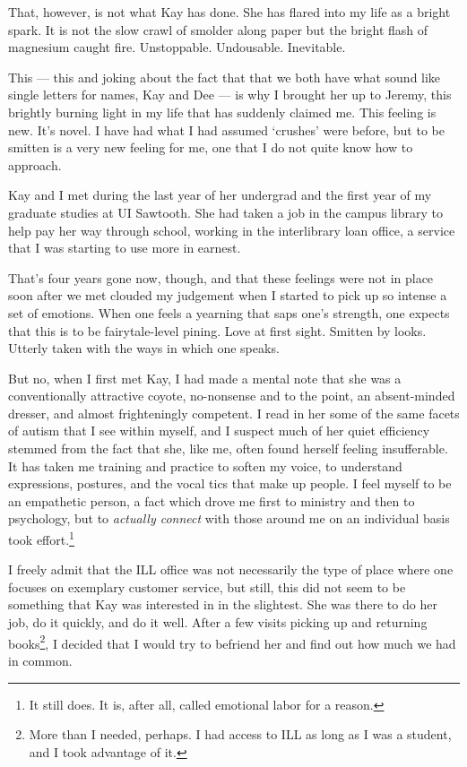 That, however, is not what Kay has done. She has flared into my life as a bright spark. It is not the slow crawl of smolder along paper but the bright flash of magnesium caught fire. Unstoppable. Undousable. Inevitable.

This --- this and joking about the fact that that we both have what sound like single letters for names, Kay and Dee --- is why I brought her up to Jeremy, this brightly burning light in my life that has suddenly claimed me. This feeling is new. It's novel. I have had what I had assumed `crushes' were before, but to be smitten is a very new feeling for me, one that I do not quite know how to approach.

Kay and I met during the last year of her undergrad and the first year of my graduate studies at UI Sawtooth. She had taken a job in the campus library to help pay her way through school, working in the interlibrary loan office, a service that I was starting to use more in earnest.

That's four years gone now, though, and that these feelings were not in place soon after we met clouded my judgement when I started to pick up so intense a set of emotions. When one feels a yearning that saps one's strength, one expects that this is to be fairytale-level pining. Love at first sight. Smitten by looks. Utterly taken with the ways in which one speaks.

But no, when I first met Kay, I had made a mental note that she was a conventionally attractive coyote, no-nonsense and to the point, an absent-minded dresser, and almost frighteningly competent. I read in her some of the same facets of autism that I see within myself, and I suspect much of her quiet efficiency stemmed from the fact that she, like me, often found herself feeling insufferable. It has taken me training and practice to soften my voice, to understand expressions, postures, and the vocal tics that make up people. I feel myself to be an empathetic person, a fact which drove me first to ministry and then to psychology, but to \emph{actually connect} with those around me on an individual basis took effort.\footnote{It still does. It is, after all, called emotional labor for a reason.}

I freely admit that the ILL office was not necessarily the type of place where one focuses on exemplary customer service, but still, this did not seem to be something that Kay was interested in in the slightest. She was there to do her job, do it quickly, and do it well. After a few visits picking up and returning books\footnote{More than I needed, perhaps. I had access to ILL as long as I was a student, and I took advantage of it.}, I decided that I would try to befriend her and find out how much we had in common.

